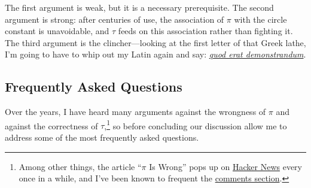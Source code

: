 \documentclass{article}
\begin{document}
The first argument is weak, but it is a necessary prerequisite. The second argument is strong: after centuries of use, the association of $\pi$ with the circle constant is unavoidable, and $\tau$ feeds on this association rather than fighting it. The third argument is the clincher---looking at the first letter of that Greek lathe, I'm going to have to whip out my Latin again and say:  \href{http://en.wikipedia.org/wiki/Q.E.D.}{\emph{quod erat demonstrandum}}.

  \subsection{Frequently Asked Questions} %
  \label{sec:faq}

Over the years, I have heard many arguments against the wrongness of $\pi$ and against the correctness of $\tau$,\footnote{Among other things, the article ``$\pi$ Is Wrong'' pops up on \href{http://news.ycombinator.com/news}{Hacker News} every once in a while, and I've been known to frequent the  \href{http://news.ycombinator.com/item?id=912082}{comments section}.} so before concluding our discussion allow me to address some of the most frequently asked questions.
\end{document}
